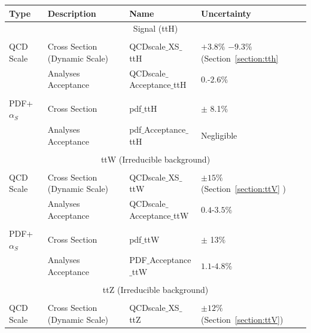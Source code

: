 \begin{table}[htbp]
  \begin{center}
    {\small     
    \begin{tabular}{|llll|}
      \hline
      Type       & Description & Name  &  Uncertainty  \\
     \hline
      \multicolumn{4}{|c|}{Signal (ttH)}\\
     \hline
         &  & &               \\
      QCD Scale                    & Cross Section (Dynamic Scale)&    QCDscale$\_$XS$\_$ttH             &    $+3.8\%$  $-9.3\%$   (Section~\ref{section:tth}      \\
                                            & Analyses Acceptance &    QCDscale$\_$Acceptance$\_$ttH             &    $0.$-$2.6\%$       \\
         & &  &              \\
      PDF+$\alpha_S$     &   Cross Section  &    pdf$\_$ttH         &     $\pm$ 8.1$\%$      \\
                                      &   Analyses Acceptance  &    pdf$\_$Acceptance$\_$ttH         &     Negligible       \\
         & &  &              \\
     \hline
      \multicolumn{4}{|c|}{ttW (Irreducible background)}\\
     \hline
         &  & &               \\
      QCD Scale                    & Cross Section (Dynamic Scale)&    QCDscale$\_$XS$\_$ttW             &    $\pm15\%$  (Section~\ref{section:ttV} )       \\
                                            & Analyses Acceptance &    QCDscale$\_$Acceptance$\_$ttW             &    $0.4$-$3.5\%$        \\
         & &  &              \\
      PDF+$\alpha_S$     &   Cross Section  &    pdf$\_$ttW         &     $\pm$ 13$\%$      \\
                                      &   Analyses Acceptance  &    PDF$\_$Acceptance$\_$ttW         &    $1.1$-$4.8\%$      \\
         & &  &               \\
     \hline
      \multicolumn{4}{|c|}{ttZ (Irreducible background)}\\
     \hline
         &  & &                \\
      QCD Scale                    & Cross Section (Dynamic Scale)&    QCDscale$\_$XS$\_$ttZ             &    $\pm12\%$     (Section~\ref{section:ttV})\\

\end{tabular}}
\end{center}
\end{table}

